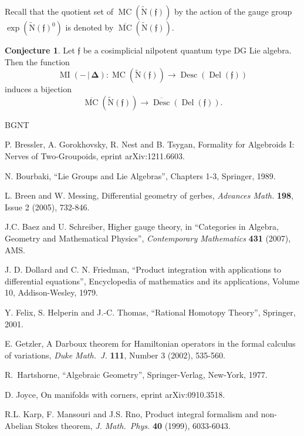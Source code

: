 \documentclass[10pt, a4paper]{amsart}
\theoremstyle{definition}
\newtheorem{conj}[equation]{Conjecture}
\numberwithin{equation}{section}
\newcommand{\opn}{\operatorname}
\newcommand{\ol}{\overline}
\newcommand{\mfrak}[1]{\mathfrak{#1}}
\newcommand{\mrm}[1]{\mathrm{#1}}
\newcommand{\bsym}[1]{\boldsymbol{#1}}
\newcommand{\til}[1]{\tilde{#1}}
\renewcommand{\vert}{\, | \,}
\newcommand{\f}{\mfrak{f}}
\begin{document}
Recall that the quotient set of $\opn{MC}(\til{\mrm{N}}(\f))$ by the action of
the gauge group $\opn{exp}(\til{\mrm{N}}(\f)^0)$ is denoted by 
$\ol{\opn{MC}}(\til{\mrm{N}}(\f))$.

\begin{conj} \label{conj:521}
Let $\f$ be a cosimplicial nilpotent quantum type DG Lie algebra. Then the
function 
\[ \opn{MI}(- \vert \bsym{\Delta}) : \opn{MC}(\til{\mrm{N}}(\f)) \to
\opn{Desc}(\opn{Del}(\f)) \]
induces a bijection 
\[ \ol{\opn{MC}}(\til{\mrm{N}}(\f)) \to \ol{\opn{Desc}}(\opn{Del}(\f)) . \]
\end{conj}





\cleardoublepage
\begin{thebibliography}{BGNT}

 P. Bressler, A. Gorokhovsky, R. Nest and B. Tsygan,
Formality for Algebroids I: Nerves of Two-Groupoids,
eprint arXiv:1211.6603.

 N. Bourbaki, ``Lie Groups and Lie Algebras'',
  Chapters 1-3, Springer, 1989.

 L. Breen and W. Messing,
  Differential geometry of gerbes,
  {\em Advances Math.} {\bf 198}, Issue 2 (2005), 732-846.

 J.C. Baez and U. Schreiber,
  Higher gauge theory, in ``Categories in Algebra, Geometry and Mathematical
  Physics'', {\em Contemporary Mathematics} {\bf 431} (2007), AMS.

 J. D. Dollard and C. N. Friedman,
  ``Product integration with applications to differential equations'',
  Encyclopedia of mathematics and its applications, Volume 10, Addison-Wesley,
  1979.

 Y. Felix, S. Helperin and J.-C. Thomas,
  ``Rational Homotopy Theory'',
  Springer, 2001.

 E. Getzler, 
  A Darboux theorem for Hamiltonian operators in the formal calculus 
  of variations,
  {\em Duke Math.\ J.} {\bf 111}, Number 3 (2002), 535-560. 

 R.\ Hartshorne, ``Algebraic Geometry'',
        Springer-Verlag, New-York, 1977.

 D. Joyce,
On manifolds with corners, eprint arXiv:0910.3518.

 R.L. Karp, F. Mansouri and J.S. Rno,
  Product integral formalism and non-Abelian Stokes theorem,
  {\em J. Math.\ Phys.} {\bf 40} (1999), 6033-6043.


\end{thebibliography}
\end{document}
